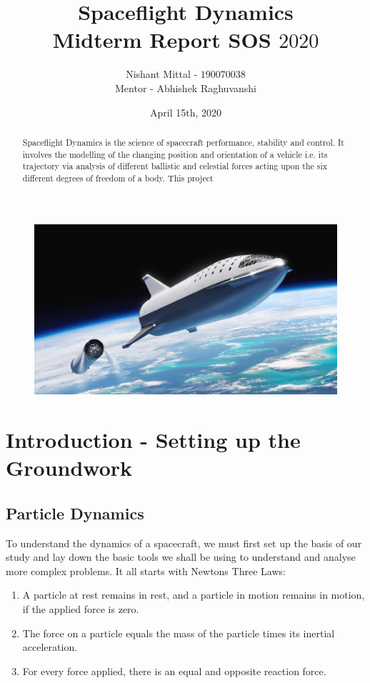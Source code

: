 \documentclass[12pt, letterpaper]{article}
\title{\textbf{Spaceflight Dynamics}\\ 
 		\large{Midterm Report SOS $2020$}}
\author{Nishant Mittal - $190070038$\\
Mentor - Abhishek Raghuvanshi}
\date{April 15th, 2020}
\begin{document}
\setlength{\parindent}{0pt}
\maketitle

\begin{figure}[h]
	\centering
    \includegraphics[width=\textwidth]{cover}
\end{figure}

\begin{abstract}
Spaceflight Dynamics is the science of spacecraft performance, stability and control. It involves the modelling of the changing position and orientation of a vehicle i.e. its trajectory via analysis of different ballistic and celestial forces acting upon the six different degrees of freedom of a body. This project 
\end{abstract}

\newpage
\tableofcontents

\newpage
\section{Introduction - Setting up the Groundwork}
\subsection{Particle Dynamics}
To understand the dynamics of a spacecraft, we must first set up the basis of our study and lay down the basic tools we shall be using to understand and analyse more complex problems. It all starts with Newtons Three Laws:
\begin{enumerate}

	\item A particle at rest remains in rest, and a particle in motion remains in motion, if the applied force is zero.
	\item The force on a particle equals the mass of the particle times its inertial acceleration.
	\item For every force applied, there is an equal and opposite reaction force.

\end{enumerate}
\end{document}
